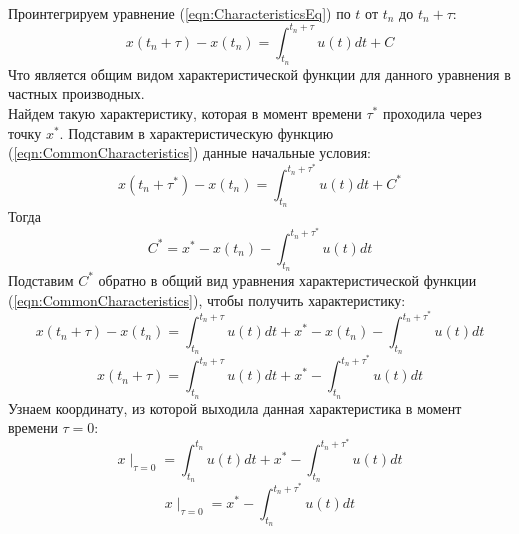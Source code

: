 \documentclass[10pt,a4paper]{article}
\begin{document}
\\Проинтегрируем уравнение (\ref{eqn:CharacteristicsEq}) по $t$ от $t_n$ до $t_n+\tau$:
\begin{equation}
\label{eqn:CommonCharacteristics}
x(t_n+\tau)-x(t_n)=\int_{t_n}^{t_n+\tau}u(t)dt + C
\end{equation}
Что является общим видом характеристической функции для данного уравнения в частных производных.
\\Найдем такую характеристику, которая в момент времени $\tau^*$ проходила через точку $x^*$. Подставим в характеристическую функцию (\ref{eqn:CommonCharacteristics}) данные начальные условия:
\[
x(t_n+\tau^*)-x(t_n)=\int_{t_n}^{t_n+\tau^*}u(t)dt + C^*
\]
Тогда
\[
C^* = x^*-x(t_n)-\int_{t_n}^{t_n+\tau^*}u(t)dt
\]
Подставим $C^*$ обратно в общий вид уравнения характеристической функции (\ref{eqn:CommonCharacteristics}), чтобы получить характеристику:
\[
x(t_n+\tau)-x(t_n)=\int_{t_n}^{t_n+\tau}u(t)dt + x^*-x(t_n)-\int_{t_n}^{t_n+\tau^*}u(t)dt
\]
\begin{equation}
\label{eqn:Characteristic}
x(t_n+\tau)=\int_{t_n}^{t_n+\tau}u(t)dt + x^*-\int_{t_n}^{t_n+\tau^*}u(t)dt
\end{equation}
Узнаем координату, из которой выходила данная характеристика в момент времени $\tau=0$:
\[
x\mid_{\tau=0}=\int_{t_n}^{t_n}u(t)dt + x^*-\int_{t_n}^{t_n+\tau^*}u(t)dt
\]
\begin{equation}
\label{eqn:CharacteristicFromZero}
x\mid_{\tau=0}=x^*-\int_{t_n}^{t_n+\tau^*}u(t)dt
\end{equation}
\end{document}

